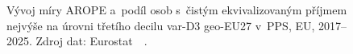 \def\strStavAropeDualYlabelTop{míra \acs{AROPE} [\si{\percent}]}%
\def\strStavAropeDualYlabelBot{podíl os. s~příjmem $\leq$ \acs{var-D3}\acs{geo-EU} [\si{\percent}]}%
\def\strStavAropeDualTitle{Míra \acs{AROPE}, porovnání metodik dle národního a~\acs{EU} rozdělení příjmů v~\acs{PPS}}%
\def\strStavAropeDualCaption{Vývoj míry \acs{AROPE} a~podíl osob s~čistým ekvivalizovaným příjmem nejvýše na úrovni třetího decilu \acs{var-D3} \acs{geo-EU27} v~\acs{PPS}, \acs{EU}, 2017--2025. Zdroj dat: Eurostat~\cite{eurostat_ilc_peps01n_PC_pop}~\cite{eurostat_ilc_di01_D3_PPS}.}%
%

\providecommand\NudgeStavAropeDualCz{2pt}%
\providecommand\NudgeStavAropeDualAt{0pt}%
\providecommand\NudgeStavAropeDualDe{5pt}%
\providecommand\NudgeStavAropeDualDk{-2pt}%
\providecommand\NudgeStavAropeDualPl{-2pt}%
\providecommand\NudgeStavAropeDualSk{3pt}%
\begin{figure}[htb]
  \centering
  \resizebox{\linewidth}{!}{}
  \caption{\strStavAropeDualCaption}
  \label{fig:stav_arope_dual}
\end{figure}
